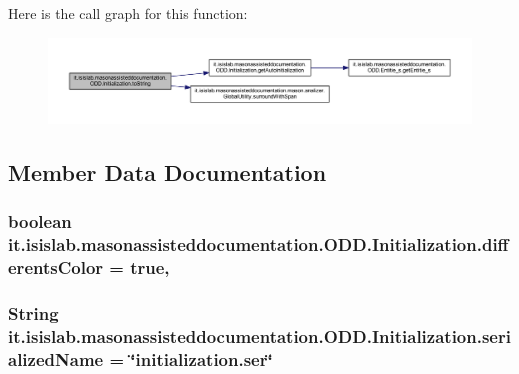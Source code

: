 Here is the call graph for this function\-:\nopagebreak
\begin{figure}[H]
\begin{center}
\leavevmode
\includegraphics[width=350pt]{classit_1_1isislab_1_1masonassisteddocumentation_1_1_o_d_d_1_1_initialization_a161826a9181c7d87cbfcb7a9bc8bdc96_cgraph}
\end{center}
\end{figure}




\subsection{Member Data Documentation}
\hypertarget{classit_1_1isislab_1_1masonassisteddocumentation_1_1_o_d_d_1_1_initialization_a1db87b1c90cde4dc9bd028895fb3b6ca}{
\subsubsection[{differents\-Color}]{\setlength{\rightskip}{0pt plus 5cm}boolean it.\-isislab.\-masonassisteddocumentation.\-O\-D\-D.\-Initialization.\-differents\-Color = true\hspace{0.3cm}{\ttfamily [static]}, {\ttfamily [private]}}}\label{classit_1_1isislab_1_1masonassisteddocumentation_1_1_o_d_d_1_1_initialization_a1db87b1c90cde4dc9bd028895fb3b6ca}
\hypertarget{classit_1_1isislab_1_1masonassisteddocumentation_1_1_o_d_d_1_1_initialization_a68d6d76d36ac88da6784e304eb0c449d}{
\subsubsection[{serialized\-Name}]{\setlength{\rightskip}{0pt plus 5cm}String it.\-isislab.\-masonassisteddocumentation.\-O\-D\-D.\-Initialization.\-serialized\-Name = \char`\"{}initialization.\-ser\char`\"{}\hspace{0.3cm}{\ttfamily [static]}}}\label{classit_1_1isislab_1_1masonassisteddocumentation_1_1_o_d_d_1_1_initialization_a68d6d76d36ac88da6784e304eb0c449d}
